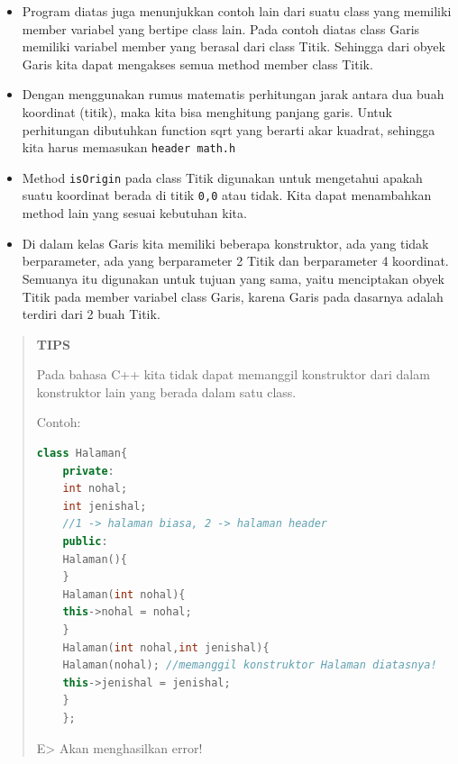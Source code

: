 \begin{itemize}
\tightlist
\item
  Program diatas juga menunjukkan contoh lain dari suatu class yang
  memiliki member variabel yang bertipe class lain. Pada contoh diatas
  class Garis memiliki variabel member yang berasal dari class Titik.
  Sehingga dari obyek Garis kita dapat mengakses semua method member
  class Titik.
\item
  Dengan menggunakan rumus matematis perhitungan jarak antara dua buah
  koordinat (titik), maka kita bisa menghitung panjang garis. Untuk
  perhitungan dibutuhkan function sqrt yang berarti akar kuadrat,
  sehingga kita harus memasukan \texttt{header\ math.h}
\item
  Method \texttt{isOrigin} pada class Titik digunakan untuk mengetahui
  apakah suatu koordinat berada di titik \texttt{0,0} atau tidak. Kita
  dapat menambahkan method lain yang sesuai kebutuhan kita.
\item
  Di dalam kelas Garis kita memiliki beberapa konstruktor, ada yang
  tidak berparameter, ada yang berparameter 2 Titik dan berparameter 4
  koordinat. Semuanya itu digunakan untuk tujuan yang sama, yaitu
  menciptakan obyek Titik pada member variabel class Garis, karena Garis
  pada dasarnya adalah terdiri dari 2 buah Titik.
\end{itemize}

\begin{quotation}
	\textbf{TIPS} 
	
	Pada
	bahasa C++ kita tidak dapat memanggil konstruktor dari dalam konstruktor
	lain yang berada dalam satu class.
	
	Contoh:
	
	\begin{lstlisting}[language=c++]
	class Halaman{
	private:
	int nohal;
	int jenishal;
	//1 -> halaman biasa, 2 -> halaman header
	public:
	Halaman(){
	}
	Halaman(int nohal){
	this->nohal = nohal;
	}
	Halaman(int nohal,int jenishal){
	Halaman(nohal); //memanggil konstruktor Halaman diatasnya!
	this->jenishal = jenishal;
	}
	};
	\end{lstlisting}
	
	E\textgreater{} Akan menghasilkan error!
\end{quotation}

